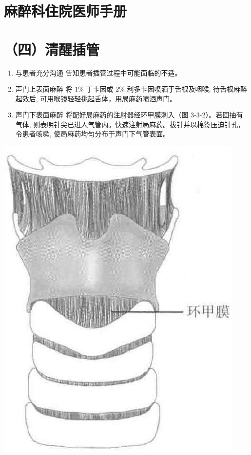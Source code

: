\documentclass[10pt]{article}
\begin{document}
\section*{麻醉科住院医师手册}
\section*{（四）清醒插管}
\begin{enumerate}
  \item 与患者充分沟通 告知患者插管过程中可能面临的不适。

  \item 声门上表面麻醉 将 $1 \%$ 丁卡因或 $2 \%$ 利多卡因喷洒于舌根及咽喉, 待舌根麻醉起效后, 可用喉镜轻轻挑起舌体，用局麻药喷洒声门。

  \item 声门下表面麻醉 将配好局麻药的注射器经环甲膜刺入（图 3-3-2）。若回抽有气体, 则表明针尖已进人气管内。快速注射局麻药。拔针并以棉签压迫针孔，令患者咳嗽, 使局麻药均匀分布于声门下气管表面。

\end{enumerate}

\begin{center}
\includegraphics[max width=\textwidth]{2024_07_05_645bb794a4d4f32ee0c8g-084}
\end{center}
\end{document}
